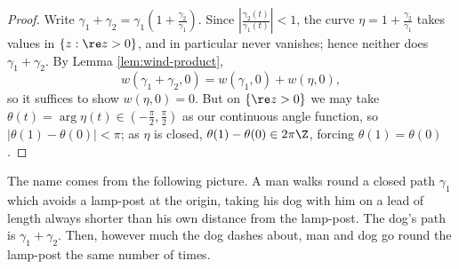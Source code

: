 \begin{proof}
	Write $\gamma_1+\gamma_2 = \gamma_1\left(1+\frac{\gamma_2}{\gamma_1}\right)$. Since $\left|\frac{\gamma_2(t)}{\gamma_1(t)}\right|<1$, the curve $\eta = 1+\frac{\gamma_2}{\gamma_1}$ takes values in $\{z : \re z>0\}$, and in particular never vanishes; hence neither does $\gamma_1+\gamma_2$. By Lemma \ref{lem:wind-product},
	$$w(\gamma_1+\gamma_2,0) = w(\gamma_1,0)+w(\eta,0),$$
	so it suffices to show $w(\eta,0)=0$. But on $\{\re z>0\}$ we may take $\theta(t) = \arg\eta(t)\in(-\tfrac\pi2,\tfrac\pi2)$ as our continuous angle function, so $|\theta(1)-\theta(0)|<\pi$; as $\eta$ is closed, $\theta(1)-\theta(0)\in2\pi\Z$, forcing $\theta(1)=\theta(0)$.
\end{proof}

The name comes from the following picture. A man walks round a closed path $\gamma_1$ which avoids a lamp-post at the origin, taking his dog with him on a lead of length always shorter than his own distance from the lamp-post. The dog's path is $\gamma_1+\gamma_2$. Then, however much the dog dashes about, man and dog go round the lamp-post the same number of times.

